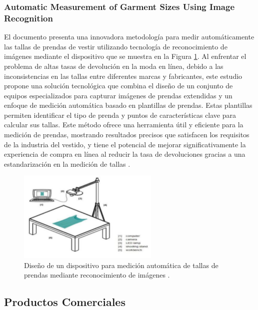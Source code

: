 \subsubsection{Automatic Measurement of Garment Sizes Using Image Recognition}

El documento presenta una innovadora metodología para medir automáticamente las tallas de prendas de vestir utilizando tecnología de reconocimiento de imágenes mediante el dispositivo que se muestra en la Figura \ref{fig:Automatic_Measurement}. Al enfrentar el problema de altas tasas de devolución en la moda en línea, debido a las inconsistencias en las tallas entre diferentes marcas y fabricantes, este estudio propone una solución tecnológica que combina el diseño de un conjunto de equipos especializados para capturar imágenes de prendas extendidas y un enfoque de medición automática basado en plantillas de prendas. Estas plantillas permiten identificar el tipo de prenda y puntos de características clave para calcular sus tallas. Este método ofrece una herramienta útil y eficiente para la medición de prendas, mostrando resultados precisos que satisfacen los requisitos de la industria del vestido, y tiene el potencial de mejorar significativamente la experiencia de compra en línea al reducir la tasa de devoluciones gracias a una estandarización en la medición de tallas \cite{Li2017AutomaticMeasurement}.

\begin{figure}[H]
	\centering
	\includegraphics[width=0.6\textwidth]{img/Automatic_Measurement.png}
	\caption[Diseño de un dispositivo para medición automática de tallas de prendas mediante reconocimiento de imágenes]{Diseño de un dispositivo para medición automática de tallas de prendas mediante reconocimiento de imágenes \cite{Li2017AutomaticMeasurement}.}
	\label{fig:Automatic_Measurement}
\end{figure}

\subsection{Productos Comerciales}

